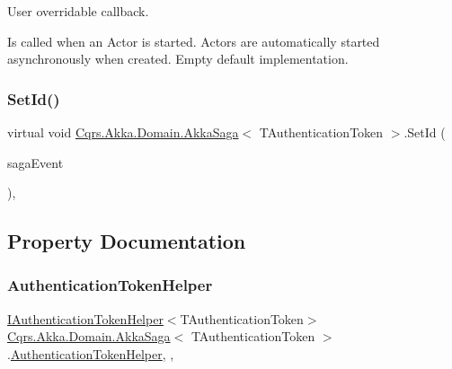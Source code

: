 User overridable callback. 

Is called when an Actor is started. Actors are automatically started asynchronously when created. Empty default implementation. 

\mbox{\label{classCqrs_1_1Akka_1_1Domain_1_1AkkaSaga_a3f3cf1a10203a1eead599e7529d41613_a3f3cf1a10203a1eead599e7529d41613}} 
\subsubsection{\texorpdfstring{Set\+Id()}{SetId()}}
{\footnotesize\ttfamily virtual void \hyperlink{classCqrs_1_1Akka_1_1Domain_1_1AkkaSaga}{Cqrs.\+Akka.\+Domain.\+Akka\+Saga}$<$ T\+Authentication\+Token $>$.Set\+Id (\begin{DoxyParamCaption}\item[{\hyperlink{interfaceCqrs_1_1Events_1_1ISagaEvent}{I\+Saga\+Event}$<$ T\+Authentication\+Token $>$}]{saga\+Event }\end{DoxyParamCaption})\hspace{0.3cm}{\ttfamily [protected]}, {\ttfamily [virtual]}}



\subsection{Property Documentation}
\mbox{\label{classCqrs_1_1Akka_1_1Domain_1_1AkkaSaga_a18e4d7faa9cd9d10ac2ac0bd3b6c9fc9_a18e4d7faa9cd9d10ac2ac0bd3b6c9fc9}} 
\subsubsection{\texorpdfstring{Authentication\+Token\+Helper}{AuthenticationTokenHelper}}
{\footnotesize\ttfamily \hyperlink{interfaceCqrs_1_1Authentication_1_1IAuthenticationTokenHelper}{I\+Authentication\+Token\+Helper}$<$T\+Authentication\+Token$>$ \hyperlink{classCqrs_1_1Akka_1_1Domain_1_1AkkaSaga}{Cqrs.\+Akka.\+Domain.\+Akka\+Saga}$<$ T\+Authentication\+Token $>$.\hyperlink{classCqrs_1_1Authentication_1_1AuthenticationTokenHelper}{Authentication\+Token\+Helper}\hspace{0.3cm}{\ttfamily [get]}, {\ttfamily [set]}, {\ttfamily [protected]}}

